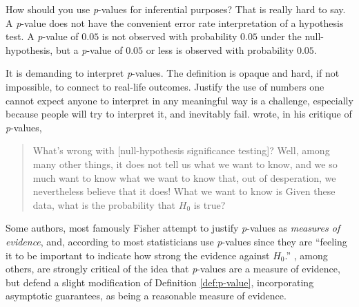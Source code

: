 How should you use \textit{p}-values for inferential purposes? That is really hard to say. A \textit{p}-value does not have the convenient error rate interpretation of a hypothesis test. A \textit{p}-value of $0.05$ is not observed with probability $0.05$ under the null-hypothesis, but a \textit{p}-value of $0.05$ or less is observed with probability $0.05$. 

It is demanding to interpret \textit{p}-values. The definition is opaque and hard, if not impossible, to connect to real-life outcomes. Justify the use of numbers one cannot expect anyone to interpret in any meaningful way is a challenge, especially because people will try to interpret it, and inevitably fail. \textcite{Cohen1994-au} wrote, in his critique of \textit{p}-values, 
\begin{quotation}
What's wrong with {[}null-hypothesis significance testing{]}? Well, among many other things, it does not tell us what we want to know, and we so much want to know what we want to know that, out of desperation, we nevertheless believe that it does! What we want to know is \textquotedbl Given these data, what is the probability that $H_{0}$ is true?\textquotedbl{}
\end{quotation}
Some authors, most famously Fisher \parencite{Liu2020-er} attempt to justify \textit{p}-values
as \textit{measures of evidence}, and, according to \textcite{Berger1987-tf}
most statisticians use \textit{p}-values since they are ``feeling it
to be important to indicate how strong the evidence against $H_{0}$.''
\textcite{Hubbard2008-cg}, among others, are strongly critical of the idea that \textit{p}-values are a measure of evidence, but \textcite{Liu2020-er} defend a slight modification of Definition \ref{def:p-value}, incorporating asymptotic guarantees, as being a reasonable measure of evidence.

